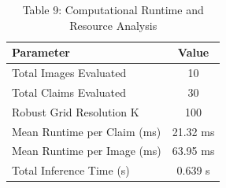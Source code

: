 \begin{table}[htbp]
\centering
\caption{Table 9: Computational Runtime and Resource Analysis}
\label{tab:table9_computational_cost}
\begin{tabular}{lc}
\hline
Parameter & Value \\
\hline
Total Images Evaluated & 10 \\
Total Claims Evaluated & 30 \\
Robust Grid Resolution K & 100 \\
Mean Runtime per Claim (ms) & 21.32 ms \\
Mean Runtime per Image (ms) & 63.95 ms \\
Total Inference Time (s) & 0.639 s \\
\hline
\end{tabular}
\end{table}